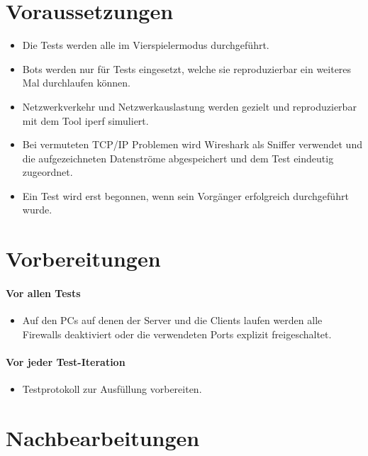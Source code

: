 \documentclass[12pt,halfparskip]{scrartcl}
\begin{document}

\section{Voraussetzungen} %
\label{sec:voraussetzungen}
\begin{itemize}
	\item Die Tests werden alle im Vierspielermodus durchgeführt.
	\item Bots werden nur für Tests eingesetzt, welche sie reproduzierbar ein weiteres Mal durchlaufen können.
	\item Netzwerkverkehr und Netzwerkauslastung werden gezielt und reproduzierbar mit dem Tool iperf simuliert.
	\item Bei vermuteten TCP/IP Problemen wird Wireshark als Sniffer verwendet und die aufgezeichneten Datenströme abgespeichert und dem Test eindeutig zugeordnet.
	\item Ein Test wird erst begonnen, wenn sein Vorgänger erfolgreich durchgeführt wurde.
\end{itemize}

\section{Vorbereitungen} %
\label{sec:vorbereitungen}
\paragraph{Vor allen Tests}\label{ssub:vorbereitungen_vor_allen_tests} %
	\begin{itemize}
		\item Auf den PCs auf denen der Server und die Clients laufen werden alle Firewalls deaktiviert oder die verwendeten Ports explizit freigeschaltet.
	\end{itemize}
\paragraph{Vor jeder Test-Iteration}\label{ssub:vorbereitungen_vor_jeder_testiteration} %
	\begin{itemize}
		\item Testprotokoll zur Ausfüllung vorbereiten.
	\end{itemize}

\section{Nachbearbeitungen}\label{sec:nachbearbeitungen} %
\end{document}
